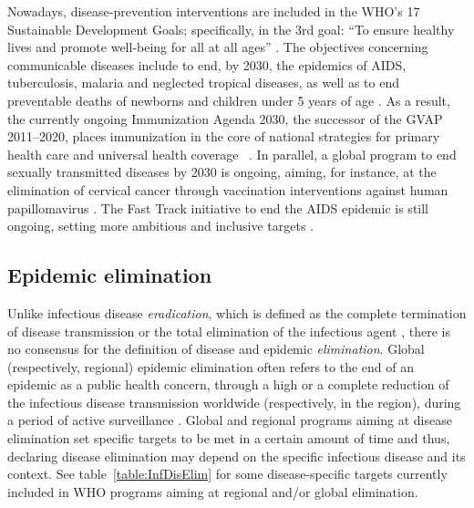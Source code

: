 
Nowadays, disease-prevention interventions are included in the WHO's 17 Sustainable Development Goals; specifically, in the 3rd goal: ``To ensure healthy lives and promote well-being for all at all ages'' \cite[]{SDG_Goal3}. The objectives concerning communicable diseases include to end, by 2030, the epidemics of AIDS, tuberculosis, malaria and neglected tropical diseases, as well as to end preventable deaths of newborns and children under 5 years of age \cite[]{SDG_Goal3}. As a result, the currently ongoing Immunization Agenda 2030, the successor of the GVAP 2011--2020, places immunization in the core of national strategies for primary health care and universal health coverage~ \cite[]{WHO_IA2030}. In parallel, a global program to end sexually transmitted diseases by 2030 is ongoing, aiming, for instance, at the elimination of cervical cancer through vaccination interventions against human papillomavirus \cite[]{WHO_STIs}. The Fast Track initiative to end the AIDS
epidemic is still ongoing, setting more ambitious and inclusive targets \cite[]{UNAIDS_EndAIDS2030}. 


\subsection{Epidemic elimination}  \label{Intro:EpiElim}

Unlike infectious disease \emph{eradication}, which is defined as the complete termination of disease transmission or the total elimination of the infectious agent \cite[]{Porta2014}, there is no consensus for the definition of disease and epidemic \emph{elimination}. Global (respectively, regional) epidemic elimination often refers to the end of an epidemic as a public health concern, through a high or a complete reduction of the infectious disease transmission worldwide (respectively, in the region), during a period of active surveillance \cite[]{Porta2014,Nishiura2016}. Global and regional programs aiming at disease elimination set specific targets to be met in a certain amount of time and thus, declaring disease elimination may depend on the specific infectious disease and its context. See table~\ref{table:InfDisElim} for some disease-specific targets currently included in WHO programs aiming at regional and/or global elimination.

